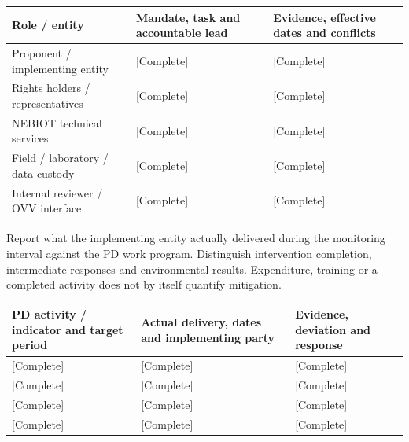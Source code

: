 {\sffamily\fontsize{8.6}{10.7}\selectfont\begin{longtable}{@{}P{48mm}P{61mm}P{53mm}@{}}
\toprule
\textbf{Role / entity} & \textbf{Mandate, task and accountable lead} & \textbf{Evidence, effective dates and conflicts}\\\midrule\endhead
\rule{0pt}{8mm}Proponent / implementing entity & [Complete] & [Complete]\\\hline
\rule{0pt}{8mm}Rights holders / representatives & [Complete] & [Complete]\\\hline
\rule{0pt}{8mm}NEBIOT technical services & [Complete] & [Complete]\\\hline
\rule{0pt}{8mm}Field / laboratory / data custody & [Complete] & [Complete]\\\hline
\rule{0pt}{8mm}Internal reviewer / OVV interface & [Complete] & [Complete]\\\hline
\end{longtable}}
Report what the implementing entity actually delivered during the monitoring interval against the PD work program. Distinguish intervention completion, intermediate responses and environmental results. Expenditure, training or a completed activity does not by itself quantify mitigation.\par
{}
{\sffamily\fontsize{8.6}{10.7}\selectfont\begin{longtable}{@{}P{48mm}P{61mm}P{53mm}@{}}
\toprule
\textbf{PD activity / indicator and target period} & \textbf{Actual delivery, dates and implementing party} & \textbf{Evidence, deviation and response}\\\midrule\endhead
\rule{0pt}{8mm}[Complete] & [Complete] & [Complete]\\\hline
\rule{0pt}{8mm}[Complete] & [Complete] & [Complete]\\\hline
\rule{0pt}{8mm}[Complete] & [Complete] & [Complete]\\\hline
\rule{0pt}{8mm}[Complete] & [Complete] & [Complete]\\\hline
\end{longtable}}
